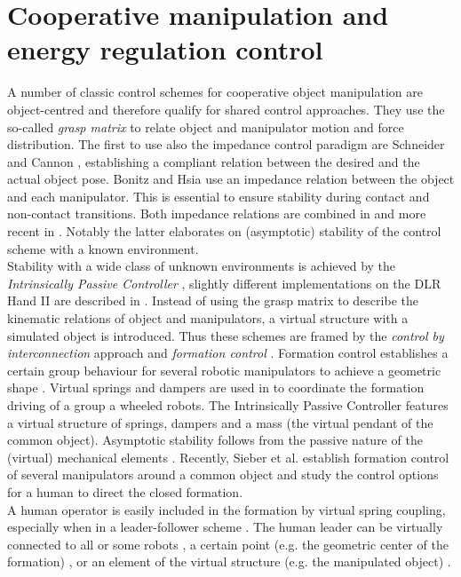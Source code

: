 \documentclass[a4paper,twoside, openright,12pt]{report}
\begin{document}
{\section{Cooperative manipulation and energy regulation control}
A number of classic control schemes for cooperative object manipulation are object-centred and therefore qualify for shared control approaches. They use the so-called \emph{grasp matrix} to relate object and manipulator motion and force distribution. The first to use also the impedance control paradigm \cite{Hogan_84} are Schneider and Cannon \cite{Schneider_92}, establishing a compliant relation between the desired and the actual object pose. Bonitz and Hsia \cite{Bonitz_96} use an impedance relation between the object and each manipulator. This is essential to ensure stability during contact and non-contact transitions. Both impedance relations are combined in \cite{Caccavale_01,Caccavale_08} and more recent in \cite{Heck_13}. Notably the latter elaborates on (asymptotic) stability of the control scheme with a known environment.\\
Stability with a wide class of unknown environments is achieved by the \emph{Intrinsically Passive Controller} \cite{Stramigioli_01}, slightly different implementations on the DLR Hand II are described in \cite{Wimboeck_06,Wimboeck_08}. Instead of using the grasp matrix to describe the kinematic relations of object and manipulators, a virtual structure with a simulated object is introduced. Thus these schemes are framed by the \emph{control by interconnection} approach \cite{Ortega_08}  and \emph{formation control} \cite{Lawton_03}. Formation control establishes a certain group behaviour for several robotic manipulators to achieve a geometric shape \cite{VosDiss_15}. Virtual springs and dampers are used in \cite{Vos_14} to coordinate the formation driving of a group a wheeled robots. The Intrinsically Passive Controller features a virtual structure of springs, dampers and a mass (the virtual pendant of the common object). Asymptotic stability follows from the passive nature of the (virtual) mechanical elements \cite{Stramigioli_15}. Recently, Sieber et al. \cite{Sieber_15} establish formation control of several manipulators around a common object and study the control options for a human to direct the closed formation. \\
A human operator is easily included in the formation by virtual spring coupling, especially when in a leader-follower scheme \cite{Scheggi_14}. The human leader can be virtually connected to all or some robots \cite{Sieber_15}, a certain point (e.g. the geometric center of the formation) \cite{Wimboeck_06}, or an element of the virtual structure (e.g. the manipulated object) \cite{Stramigioli_01}.\\
}
\end{document}
